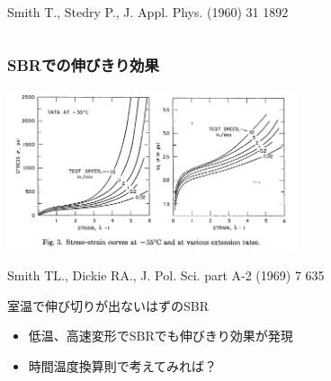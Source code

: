 \documentclass[11pt, dvipdfmx]{beamer}
\begin{document}
\begin{frame}
\begin{columns}[totalwidth=1\textwidth]
    {\tiny Smith T., Stedry P., J. Appl. Phys. (1960) 31 1892}
    
    \end{columns}
    \end{frame}

\begin{frame}
    \frametitle{SBRでの伸びきり効果}
    
    \centering
    \includegraphics[width=8.5cm]{./fig/SBR_lowTemp_2.png}
    
    {\tiny Smith TL., Dickie RA., J. Pol. Sci. part A-2 (1969) 7 635}
    
    \begin{alertblock}{室温で伸び切りが出ないはずのSBR}
    \begin{itemize}
    \item
    低温、高速変形でSBRでも伸びきり効果が発現
    \item
    時間温度換算則で考えてみれば？
    \end{itemize}
    \end{alertblock}
    \end{frame}

    
\end{document}
